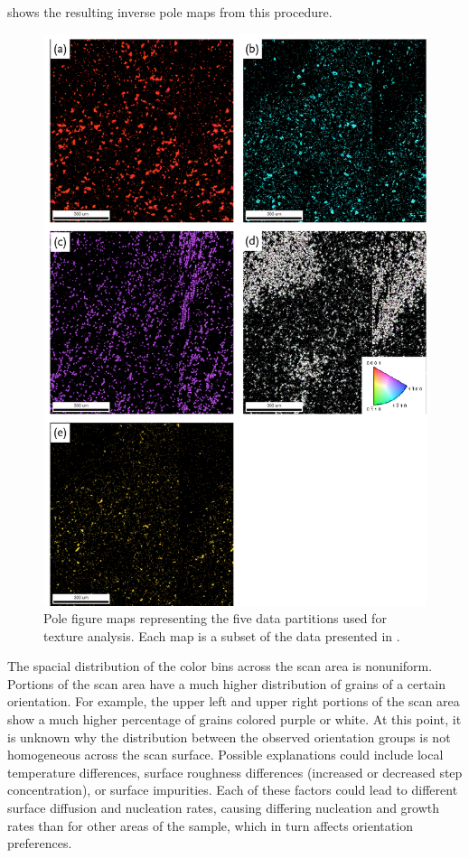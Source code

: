  shows the resulting inverse pole maps from this procedure. 
\begin{figure}
	\includegraphics[width=\textwidth]{partitionmaps.pdf}
	\caption[ figure maps for five data partitions]{%
		Pole figure maps representing the five data partitions 
		used for texture analysis. Each map is a subset of the 
		data presented in .}
	\label{fig:partitionmaps}
\end{figure}
The spacial distribution of the color bins across the scan area is nonuniform. Portions of
the scan area have a much higher distribution of grains of a certain orientation. For
example, the upper left and upper right portions of the scan area show a much higher
percentage of grains colored purple or white. At this point, it is unknown why the
distribution between the observed orientation groups is not homogeneous across the scan
surface. Possible explanations could include local temperature differences, surface
roughness differences (increased or decreased step concentration), or surface impurities.
Each of these factors could lead to different surface diffusion and nucleation rates,
causing differing nucleation and growth rates than for other areas of the sample, which in
turn affects orientation preferences.


